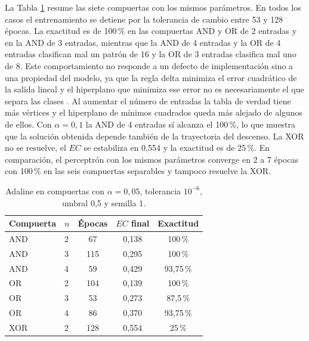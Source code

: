\documentclass[conference]{IEEEtran}
\begin{document}
La Tabla \ref{tab:ada_comp} resume las siete compuertas con los mismos par\'ametros. En todos los casos el entrenamiento se detiene por la tolerancia de cambio entre 53 y 128 \'epocas. La exactitud es de 100\,\% en las compuertas AND y OR de 2 entradas y en la AND de 3 entradas, mientras que la AND de 4 entradas y la OR de 4 entradas clasifican mal un patr\'on de 16 y la OR de 3 entradas clasifica mal uno de 8. Este comportamiento no responde a un defecto de implementaci\'on sino a una propiedad del modelo, ya que la regla delta minimiza el error cuadr\'atico de la salida lineal y el hiperplano que minimiza ese error no es necesariamente el que separa las clases \cite{bishop2006}. Al aumentar el n\'umero de entradas la tabla de verdad tiene m\'as v\'ertices y el hiperplano de m\'inimos cuadrados queda m\'as alejado de algunos de ellos. Con $\alpha = 0{,}1$ la AND de 4 entradas s\'i alcanza el 100\,\%, lo que muestra que la soluci\'on obtenida depende tambi\'en de la trayectoria del descenso. La XOR no se resuelve, el $EC$ se estabiliza en 0,554 y la exactitud es de 25\,\%. En comparaci\'on, el perceptr\'on con los mismos par\'ametros converge en 2 a 7 \'epocas con 100\,\% en las seis compuertas separables y tampoco resuelve la XOR.

\begin{table}[!t]
\caption{Adaline en compuertas con $\alpha = 0{,}05$, tolerancia $10^{-6}$, umbral 0,5 y semilla 1.}
\label{tab:ada_comp}
\centering
\small
\begin{tabular}{@{}llccc@{}}
\toprule
Compuerta & $n$ & \'Epocas & $EC$ final & Exactitud \\
\midrule
AND & 2 & 67  & 0,138 & 100\,\% \\
AND & 3 & 115 & 0,295 & 100\,\% \\
AND & 4 & 59  & 0,429 & 93,75\,\% \\
OR  & 2 & 104 & 0,139 & 100\,\% \\
OR  & 3 & 53  & 0,273 & 87,5\,\% \\
OR  & 4 & 86  & 0,370 & 93,75\,\% \\
XOR & 2 & 128 & 0,554 & 25\,\% \\
\bottomrule
\end{tabular}
\end{table}
\end{document}
